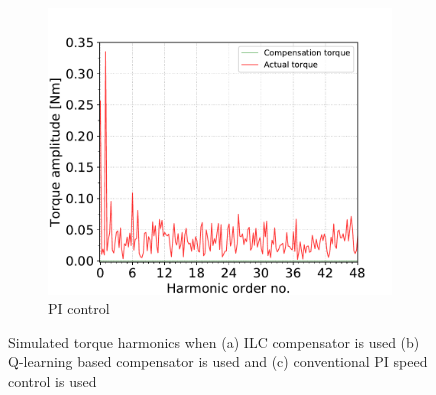 \begin{figure}[hb]
\begin{subfigure}{\linewidth}
\centering
\includegraphics[width=.5\textwidth]{images/a-sim-ilc-disabled.pdf}
\caption{PI control}
\label{sim:c}
\end{subfigure}
\caption{Simulated torque harmonics when (a) ILC compensator is used (b) Q-learning based compensator is used and (c) conventional PI speed control is used}
\label{sim:torque-ripple}
\end{figure}



\clearpage
